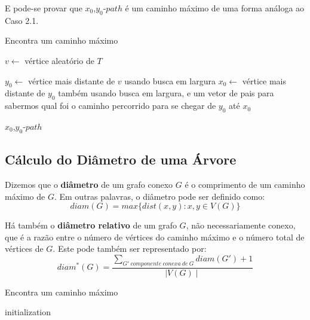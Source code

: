 \documentclass[a4paper,12pt]{article}
\begin{document}
\begin{itemize}

			E pode-se provar que $x_0$,$y_0$-$path$ é um caminho
			máximo de uma forma análoga ao Caso 2.1.


	


			\begin{algorithm}[H]

				\caption{Encontra um caminho máximo}
				$v \leftarrow$ vértice aleatório de $T$\;

				$y_0 \leftarrow$ vértice mais distante de $v$
				usando busca em largura\;
				$x_0 \leftarrow$ vértice mais distante de $y_0$
				também usando busca em largura, e um vetor de 
				pais para sabermos qual foi o caminho percorrido
				para se chegar de $y_0$ até $x_0$\;

				\Return $x_0$,$y_0$-$path$\;
				
			\end{algorithm}	




        \end{itemize}

    	\newpage


    \subsection{Cálculo do Diâmetro de uma Árvore}
    	Dizemos que o \textbf{diâmetro} de um grafo conexo $G$ é o
    	comprimento de um caminho máximo de $G$. 
    	Em outras palavras, o diâmetro pode ser definido como:
    	$$ diam(G)=max\{dist(x,y):x,y\in V(G)\} $$

    	\bigskip

    	Há também o \textbf{diâmetro relativo} de um grafo $G$,
    	não necessariamente conexo, que é a razão entre o número
    	de vértices do caminho máximo e o número total de vértices
    	de $G$. Este pode também ser representado por:
    	$$ diam^*(G) = \frac{\displaystyle\sum_{
    	G'~componente~conexa~de~G}^{}diam(G')+1}{\mid V(G)\mid} $$
    


\newpage

    		\begin{algorithm}[H]

				\caption{Encontra um caminho máximo}
				initialization\;
			\end{algorithm}	
    
    
\end{document}
